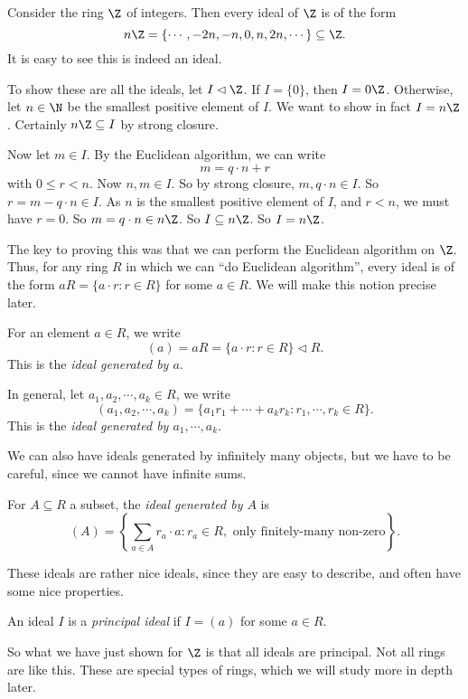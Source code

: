 \documentclass[a4paper]{article}
\begin{document}
\begin{eg}
  Consider the ring $\Z$ of integers. Then every ideal of $\Z$ is of the form
  \[
    n\Z = \{\cdots, -2n, -n, 0, n, 2n, \cdots\} \subseteq \Z.
  \]
  It is easy to see this is indeed an ideal.

  To show these are all the ideals, let $I \lhd \Z$. If $I = \{0\}$, then $I = 0\Z$. Otherwise, let $n \in \N$ be the smallest positive element of $I$. We want to show in fact $I = n\Z$. Certainly $n\Z \subseteq I$ by strong closure.

  Now let $m \in I$. By the Euclidean algorithm, we can write
  \[
    m = q \cdot n + r
  \]
  with $0 \leq r < n$. Now $n,m \in I$. So by strong closure, $m, q \cdot n \in I$. So $r = m - q\cdot n \in I$. As $n$ is the smallest positive element of $I$, and $r < n$, we must have $r = 0$. So $m = q\cdot n \in n\Z$. So $I \subseteq n\Z$. So $I = n\Z$.
\end{eg}
The key to proving this was that we can perform the Euclidean algorithm on $\Z$. Thus, for any ring $R$ in which we can ``do Euclidean algorithm'', every ideal is of the form $aR = \{a \cdot r: r \in R\}$ for some $a \in R$. We will make this notion precise later.

\begin{defi}
  For an element $a \in R$, we write
  \[
    (a) = aR = \{a \cdot r: r \in R\} \lhd R.
  \]
  This is the \emph{ideal generated by $a$}.

  In general, let $a_1, a_2, \cdots, a_k \in R$, we write
  \[
    (a_1, a_2, \cdots, a_k) = \{ a_1 r_1 + \cdots + a_k r_k : r_1, \cdots, r_k \in R\}.
  \]
  This is the \emph{ideal generated by $a_1, \cdots, a_k$}.
\end{defi}
We can also have ideals generated by infinitely many objects, but we have to be careful, since we cannot have infinite sums.
\begin{defi}
  For $A \subseteq R$ a subset, the \emph{ideal generated by $A$} is
  \[
    (A) = \left\{\sum_{a \in A} r_a \cdot a: r_a \in R, \text{ only finitely-many non-zero}\right\}.
  \]
\end{defi}

These ideals are rather nice ideals, since they are easy to describe, and often have some nice properties.
\begin{defi}
  An ideal $I$ is a \emph{principal ideal} if $I = (a)$ for some $a \in R$.
\end{defi}
So what we have just shown for $\Z$ is that all ideals are principal. Not all rings are like this. These are special types of rings, which we will study more in depth later.
\end{document}
